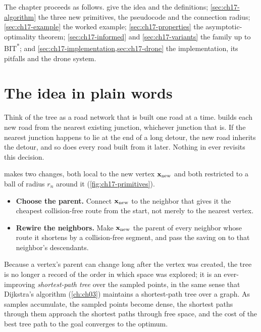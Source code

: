 The chapter proceeds as follows. 
give the idea and the definitions; \cref{sec:ch17-algorithm} the three new
primitives, the pseudocode and the connection radius;
\cref{sec:ch17-example} the worked example; \cref{sec:ch17-properties} the
asymptotic-optimality theorem; \cref{sec:ch17-informed} \irrtstar and
\cref{sec:ch17-variants} the family up to BIT\textsuperscript{*}; and
\cref{sec:ch17-implementation,sec:ch17-drone} the implementation, its
pitfalls and the drone system.

\section{The idea in plain words}
\label{sec:ch17-intuition}

Think of the \rrt tree as a road network that is built one road at a time.
\rrt builds each new road from the nearest existing junction, whichever
junction that is. If the nearest junction happens to lie at the end of a
long detour, the new road inherits the detour, and so does every road built
from it later. Nothing in \rrt ever revisits this decision.

\rrtstar makes two changes, both local to the new vertex $\mathbf{x}_{\mathrm{new}}$
and both restricted to a ball of radius $r_n$ around it
(\cref{fig:ch17-primitives}).
\begin{itemize}
  \item \textbf{Choose the parent.} Connect
  $\mathbf{x}_{\mathrm{new}}$ to the neighbor that gives it the cheapest
  collision-free route from the start, not merely to the nearest vertex.
  \item \textbf{Rewire the neighbors.} Make
  $\mathbf{x}_{\mathrm{new}}$ the parent of every neighbor whose route it shortens
  by a collision-free segment, and pass the saving on to that neighbor's
  descendants.
\end{itemize}
Because a vertex's parent can change long after the vertex was created,
the tree is no longer a record of the order in which space was explored; it
is an ever-improving \emph{shortest-path tree} over the sampled points, in
the same sense that Dijkstra's algorithm (\cref{ch:ch03}) maintains a
shortest-path tree over a graph. As samples accumulate, the sampled points
become dense, the shortest paths through them approach the shortest paths
through free space, and the cost of the best tree path to the goal
converges to the optimum.

